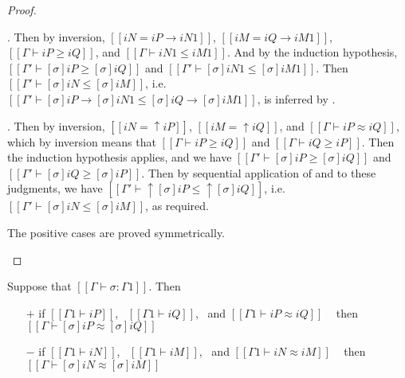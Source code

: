 \begin{proof}
\begin{caseof}
    \item {}. Then by inversion,
      $[[iN = iP → iN1]]$, $[[iM = iQ → iM1]]$, $[[Γ ⊢ iP ≥ iQ]]$, and $[[Γ ⊢ iN1 ≤ iM1]]$.
      And by the induction hypothesis, $[[Γ' ⊢ [σ]iP ≥ [σ]iQ]]$ and $[[Γ' ⊢ [σ]iN1 ≤ [σ]iM1]]$.
      Then $[[Γ' ⊢ [σ]iN ≤ [σ]iM]]$, i.e. $[[Γ' ⊢ [σ]iP → [σ]iN1 ≤ [σ]iQ → [σ]iM1]]$,
      is inferred by .
    \item {}. Then by inversion,
      $[[iN = ↑iP]]$, $[[iM = ↑iQ]]$, and $[[Γ ⊢ iP ≈ iQ]]$,
      which by inversion means that $[[Γ ⊢ iP ≥ iQ]]$ and $[[Γ ⊢ iQ ≥ iP]]$.
      Then the induction hypothesis applies, and we have $[[Γ' ⊢ [σ]iP ≥ [σ]iQ]]$
      and $[[Γ' ⊢ [σ]iQ ≥ [σ]iP]]$. 
      Then by sequential application of  
      and  to these judgments,
      we have $[[Γ' ⊢ ↑[σ]iP ≤ ↑[σ]iQ]]$, i.e.
      $[[Γ' ⊢ [σ]iN ≤ [σ]iM]]$, as required.
    \item The positive cases are proved symmetrically.
  \end{caseof}
\end{proof}

\begin{corollary}
  \label{corollary:subst-pres-equiv}
  Suppose that $[[Γ ⊢ σ : Γ1]]$. Then
    \begin{itemize}
      \item[$+$] if $[[Γ1 ⊢ iP]]$,~ $[[Γ1 ⊢ iQ]]$,~ and $[[Γ1 ⊢ iP ≈ iQ]]$ ~ 
        then $[[Γ ⊢ [σ]iP ≈ [σ]iQ]]$
      \item[$-$] if $[[Γ1 ⊢ iN]]$,~ $[[Γ1 ⊢ iM]]$,~ and $[[Γ1 ⊢ iN ≈ iM]]$ ~ 
        then $[[Γ ⊢ [σ]iN ≈ [σ]iM]]$
    \end{itemize}
\end{corollary}


